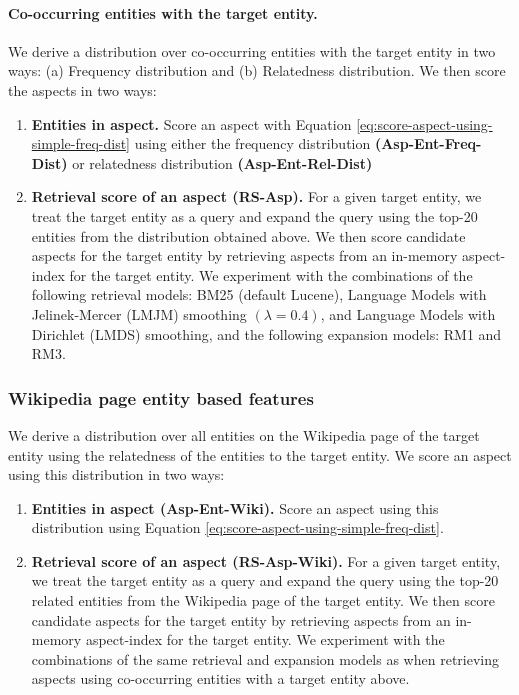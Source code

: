 \documentclass[sigconf,authordraft]{acmart}
\begin{document}
\paragraph{Co-occurring entities with the target entity.} We derive a distribution over co-occurring entities with the target entity in two ways: (a) Frequency distribution and (b) Relatedness distribution. We then score the aspects in two ways: 
\begin{enumerate}
    \item \textbf{Entities in aspect.} Score an aspect with Equation \ref{eq:score-aspect-using-simple-freq-dist} using either the frequency distribution \textbf{(Asp-Ent-Freq-Dist)} or relatedness distribution \textbf{(Asp-Ent-Rel-Dist)}
    
     \item \textbf{Retrieval score of an aspect (RS-Asp).} For a given target entity, we treat the target entity as a query and expand the query using the top-20 entities from the distribution obtained above. We then score candidate aspects for the target entity by retrieving aspects from an in-memory aspect-index for the target entity. We experiment with the combinations of the following retrieval models: BM25 (default Lucene), Language Models with Jelinek-Mercer (LMJM) smoothing $(\lambda = 0.4)$, and Language Models with Dirichlet (LMDS) smoothing, and the following expansion models: RM1 and RM3.
\end{enumerate}


\subsubsection{Wikipedia page entity based features}
\label{subsubsec:Wikipedia page entity based features}
We derive a distribution over all entities on the Wikipedia page of the target entity using the relatedness of the entities to the target entity. We score an aspect using this distribution in two ways:
\begin{enumerate}
    \item \textbf{Entities in aspect (Asp-Ent-Wiki).} Score an aspect using this distribution using Equation \ref{eq:score-aspect-using-simple-freq-dist}.
    
    \item \textbf{Retrieval score of an aspect (RS-Asp-Wiki).} For a given target entity, we treat the target entity as a query and expand the query using the top-20 related entities from the Wikipedia page of the target entity. We then score candidate aspects for the target entity by retrieving aspects from an in-memory aspect-index for the target entity. We experiment with the combinations of the same retrieval and expansion models as when retrieving aspects using co-occurring entities with a target entity above.
\end{enumerate}
\end{document}
